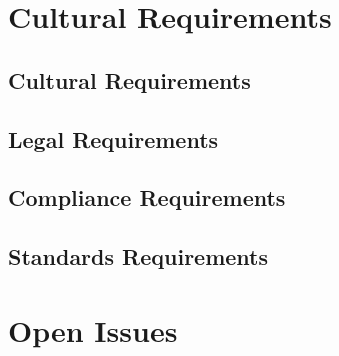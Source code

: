 \documentclass[paper=letter, fontsize=10pt]{scrartcl}
\numberwithin{equation}{section}		%
\numberwithin{figure}{section}			%
\numberwithin{table}{section}				%
\begin{document}
\section{Cultural Requirements}
\subsection{Cultural Requirements}
\subsection{Legal Requirements}
\subsection{Compliance Requirements}
\subsection{Standards Requirements}

\section{Open Issues}

\end{document}
